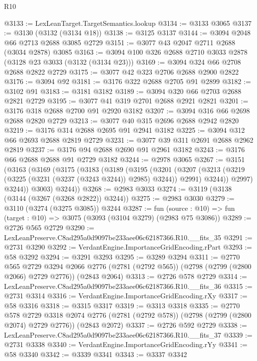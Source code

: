 \begin{lexlean}{R10}
\begin{coremodule}
@3133 := LexLeanTarget.TargetSemantics.lookup
@3134 := @3133 @3065
@3137 := @3130 (@3132 (@3134 @18))
@3138 := @3125 @3137
@3144 := @3094 @2048 @66 @2713 @2688 @3085 @2729
@3151 := @3077 @43 @2047 @2711 @2688 (@3034 @2878) @3085
@3163 := @3094 @100 @326 @2688 @2710 @3033 @2878 (@3128 @23 @3033 (@3132 (@3134 @23)))
@3169 := @3094 @324 @66 @2708 @2688 @2822 @2729
@3175 := @3077 @42 @323 @2706 @2688 @2900 @2822
@3176 := @3094 @92
@3181 := @3176 @322 @2688 @2705 @91 @2899
@3182 := @3102 @91
@3183 := @3181 @3182
@3189 := @3094 @320 @66 @2703 @2688 @2821 @2729
@3195 := @3077 @41 @319 @2701 @2688 @2921 @2821
@3201 := @3176 @318 @2688 @2700 @91 @2920 @3182
@3207 := @3094 @316 @66 @2698 @2688 @2820 @2729
@3213 := @3077 @40 @315 @2696 @2688 @2942 @2820
@3219 := @3176 @314 @2688 @2695 @91 @2941 @3182
@3225 := @3094 @312 @66 @2693 @2688 @2819 @2729
@3231 := @3077 @39 @311 @2691 @2688 @2962 @2819
@3237 := @3176 @94 @2688 @2690 @91 @2961 @3182
@3243 := @3176 @66 @2688 @2688 @91 @2729 @3182
@3244 := @2978 @3065
@3267 := @3151
    (@3163
      (@3169
        (@3175
          (@3183
            (@3189
              (@3195
                (@3201
                  (@3207
                    (@3213 (@3219 (@3225 (@3231 (@3237 (@3243 @3244)) @2985) @3244)) @2991)
                    @3244))
                @2997)
              @3244))
          @3003)
        @3244))
@3268 := @2983 @3033
@3274 := @3119 (@3138 (@3144 (@3267 (@3268 @2822)) @3244))
@3275 := @2983 @3030
@3279 := @3110 (@3274 (@3275 @3085)) @3244
@3287 := fun (source : @10) => fun (target : @10) => @3075 (@3093 (@3104 @3279) (@2983 @75 @3086))
@3289 := @2726 @565 @2729
@3290 := LexLeanPreserve.C8ad295a0d9097be233aee06c62187366.R10.__fits_35
@3291 := @2731 @3290
@3292 := VerdantEngine.ImportanceGridEncoding.rPart
@3293 := @58 @3292
@3294 := @3291 @3293
@3295 := @3289 @3294
@3311 := @2770
    @565
    @2729
    @3294
    @2066
    @2776
    (@2781 (@2792 @565))
    (@2798 (@2799 (@2800 @2066) @2729 @2776))
    (@2843 @2064)
@3313 := @2726 @578 @2729
@3314 := LexLeanPreserve.C8ad295a0d9097be233aee06c62187366.R10.__fits_36
@3315 := @2731 @3314
@3316 := VerdantEngine.ImportanceGridEncoding.rXy
@3317 := @58 @3316
@3318 := @3315 @3317
@3319 := @3313 @3318
@3335 := @2770
    @578
    @2729
    @3318
    @2074
    @2776
    (@2781 (@2792 @578))
    (@2798 (@2799 (@2800 @2074) @2729 @2776))
    (@2843 @2072)
@3337 := @2726 @592 @2729
@3338 := LexLeanPreserve.C8ad295a0d9097be233aee06c62187366.R10.__fits_37
@3339 := @2731 @3338
@3340 := VerdantEngine.ImportanceGridEncoding.rYy
@3341 := @58 @3340
@3342 := @3339 @3341
@3343 := @3337 @3342

\end{coremodule}
\end{lexlean}
